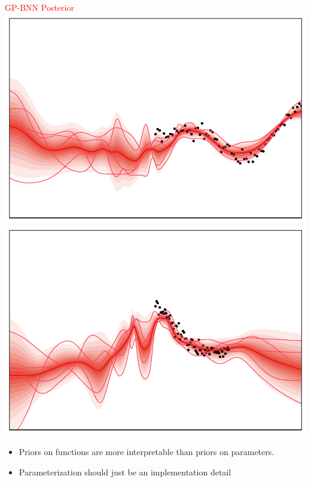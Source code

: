 \documentclass[landscape,a1,final,a4resizeable]{include/a0poster}
\newcommand{\X}{\B X}
\newcommand{\B}[1]{\ensuremath{  \mathbf{#1} } }
\newcommand{\pbnn}{p_{\text{\tiny BNN}}}
\newcommand{\col}[1]{{\color{camLightBlue}\textbf{#1}}}%
\begin{document}
\begin{minipage}[t][0pt]{\linewidth}
\begin{poster}
\begin{multicols}{3}
\begin{minipage}[t][14cm][t]{.3\textwidth}
{\begin{center}
\textcolor{Red}{GP-BNN Posterior}\\
\includegraphics[width=.48\textwidth]{figures/xsinxgppbnn.pdf} 
\includegraphics[width=.48\textwidth]{figures/expxgppbnn.pdf}    
\end{center}


}

\vspace{1cm}

\begin{itemize}
\item Priors on functions are more interpretable than priors on parameters.
\item Parameterization should just be an implementation detail
\end{itemize}
\end{minipage}

\end{multicols}
\end{poster}
\end{minipage}
\end{document}
